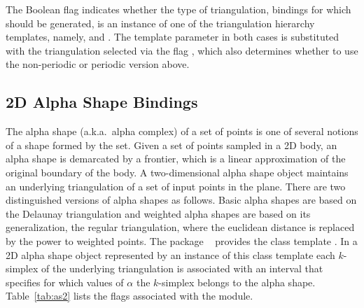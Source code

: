 The \cmake{} Boolean flag  indicates whether the type of triangulation, bindings for which should be generated, is an instance of one of the triangulation hierarchy templates, namely,  and
. The template parameter in both cases is substituted with the triangulation selected via the \cmake{} flag
, which also determines whether to use the non-periodic or periodic version above.

\subsection{2D Alpha Shape Bindings}
\label{ssec:modules:as2}
The alpha shape (a.k.a.\ alpha complex) of a set of points is one of several notions of a shape formed by the set. Given a set of points sampled in a 2D body, an alpha shape is demarcated by a frontier, which is a linear approximation of the original boundary of the body. A two-dimensional alpha shape object maintains an underlying triangulation of a set of input points in the plane. There are two distinguished versions of alpha shapes as follows. Basic alpha shapes are based on the Delaunay triangulation and weighted alpha shapes are based on its generalization, the regular triangulation, where the euclidean distance is replaced by the power to weighted points. The package \iiDAlphaShapesPackage{}~\cite{cgal:d-as2-21a} provides the class template . In a 2D alpha shape object represented by an instance of this class template each $k$-simplex of the underlying triangulation is associated with an interval that specifies for which values of $\alpha$ the $k$-simplex belongs to the alpha shape. Table~\ref{tab:as2} lists the \cmake{} flags associated with the \iiDAlphaShapesPackage{} module.

\begin{table}[!htp]
  \caption{\iiiDAlphaShapesPackage{} module flags}
  \centering{}
 \label{tab:as2}
\end{table}


